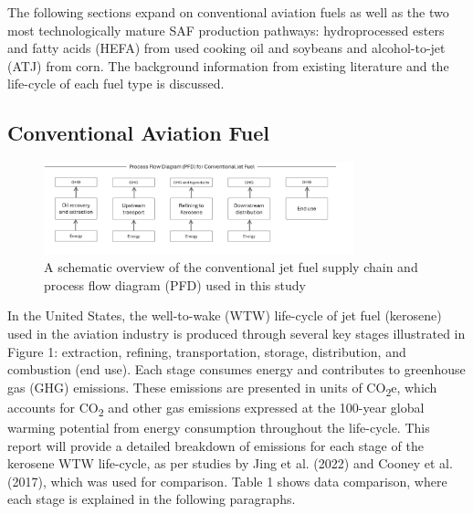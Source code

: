 \documentclass[12pt]{article}
\begin{document}
The following sections expand on conventional aviation fuels as well as the two most technologically mature SAF production pathways: hydroprocessed esters and fatty acids (HEFA) from used cooking oil and soybeans and alcohol-to-jet (ATJ) from corn. The background information from existing literature and the life-cycle of each fuel type is discussed.


\subsection{Conventional Aviation Fuel }

\begin{figure}[H]
\centering
\includegraphics[width=0.8\textwidth]{Figures/Fig 1.png} %
\caption{A schematic overview of the conventional jet fuel supply chain and process flow diagram (PFD) used in this study}
\label{fig:figure 1}
\end{figure}

In the United States, the well-to-wake (WTW) life-cycle of jet fuel (kerosene) used in the aviation industry is produced through several key stages illustrated in Figure 1: extraction, refining, transportation, storage, distribution, and combustion (end use). Each stage consumes energy and contributes to greenhouse gas (GHG) emissions. These emissions are presented in units of CO\textsubscript{2}e, which accounts for CO\textsubscript{2} and other gas emissions expressed at the 100-year global warming potential from energy consumption throughout the life-cycle. This report will provide a detailed breakdown of emissions for each stage of the kerosene WTW life-cycle, as per studies by Jing et al. (2022) and Cooney et al. (2017), which was used for comparison. Table 1 shows data comparison, where each stage is explained in the following paragraphs.
\end{document}
